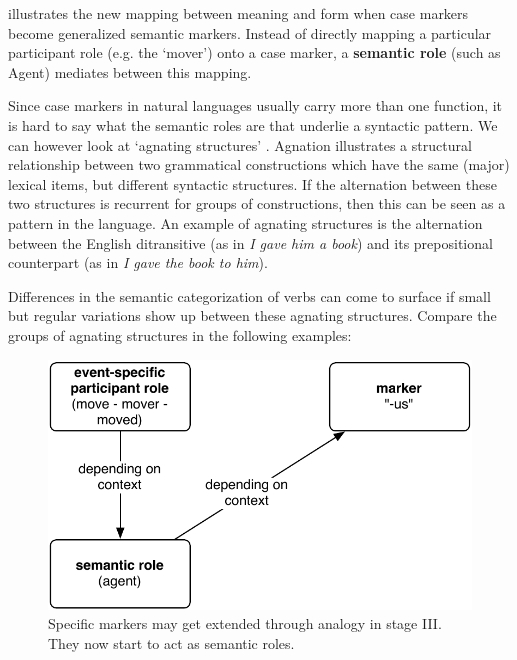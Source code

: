  illustrates the new mapping between meaning and form when case markers become generalized semantic markers. Instead of directly mapping a particular participant role (e.g. the `mover') onto a case marker, a {\bfseries semantic role} (such as Agent) mediates between this mapping.

Since case markers in natural languages usually carry more than one function, it is hard to say what the semantic roles are that underlie a syntactic pattern. We can however look at `agnating structures' \citep{gleason65linguistics}. Agnation illustrates a structural relationship between two grammatical constructions which have the same (major) lexical items, but different syntactic structures. If the alternation between these two structures is recurrent for groups of constructions, then this can be seen as a pattern in the language. An example of agnating structures is the alternation between the English ditransitive (as in {\em I gave him a book}) and its prepositional counterpart (as in {\em I gave the book to him}). 

Differences in the semantic categorization of verbs can come to surface if small but regular variations show up between these agnating structures. Compare the groups of agnating structures in the following examples:

\begin{figure}[t]
\centerline{\includegraphics[scale=0.6]{chap-introduction/figs/stage3}}
  \caption[Formation of case markers: stage III]{Specific markers may get extended through analogy in stage III. They now start to act as semantic roles.}
   \label{f:stage3}
\end{figure}

